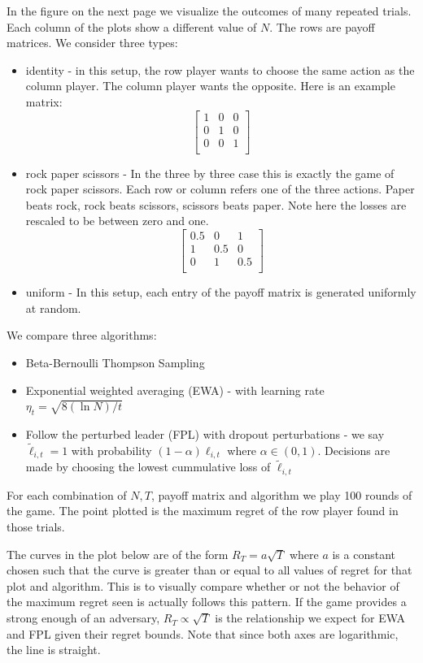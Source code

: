 \documentclass[10pt,a4paper]{article} %
\begin{document}
	In the figure on the next page we visualize the outcomes of many repeated trials.  Each column of the plots show a different value of $N$.  The rows are payoff matrices.  We consider three types: 
	\begin{itemize}
		\item identity - in this setup, the row player wants to choose the same action as the column player.  The column player wants the opposite.  Here is an example matrix:
		$$
		\begin{bmatrix}
			1  &  0 & 0     \\
			0  &  1 & 0     \\
			0  &  0 & 1     \\
		\end{bmatrix}
		$$
		\item rock paper scissors - In the three by three case this is exactly the game of rock paper scissors.  Each row or column refers one of the three actions.  Paper beats rock, rock beats scissors, scissors beats paper.  Note here the losses are rescaled to be between zero and one.
		$$
		\begin{bmatrix}
			0.5  &  0 & 1     \\
			1  &  0.5 & 0     \\
			0  &  1  & 0.5    \\
		\end{bmatrix}
		$$
		\item uniform - In this setup, each entry of the payoff matrix is generated uniformly at random.
	\end{itemize}
	We compare three algorithms: 
	\begin{itemize}
		\item Beta-Bernoulli Thompson Sampling
		\item Exponential weighted averaging (EWA) - with learning rate $\eta_t = \sqrt{8 (\ln{N})/t}$
		\item Follow the perturbed leader (FPL) with dropout perturbations -  we say $\widetilde{\ell}_{i, t} = 1$ with probability $(1 - \alpha) \ell_{i, t}$ where $\alpha \in (0, 1)$.  Decisions are made by choosing the lowest cummulative loss of $\widetilde{\ell}_{i, t}$
	\end{itemize}

	For each combination of $N, T$, payoff matrix and algorithm we play 100 rounds of the game.  The point plotted is the maximum regret of the row player found in those trials.

	The curves in the plot below are of the form $R_T = a \sqrt{T}$ where $a$ is a constant chosen such that the curve is greater than or equal to all values of regret for that plot and algorithm.  This is to visually compare whether or not the behavior of the maximum regret seen is actually follows this pattern. If the game provides a strong enough of an adversary, $R_T \propto \sqrt{T}$ is the relationship we expect for EWA and FPL given their regret bounds.  Note that since both axes are logarithmic, the line is straight. 
	
\end{document}
